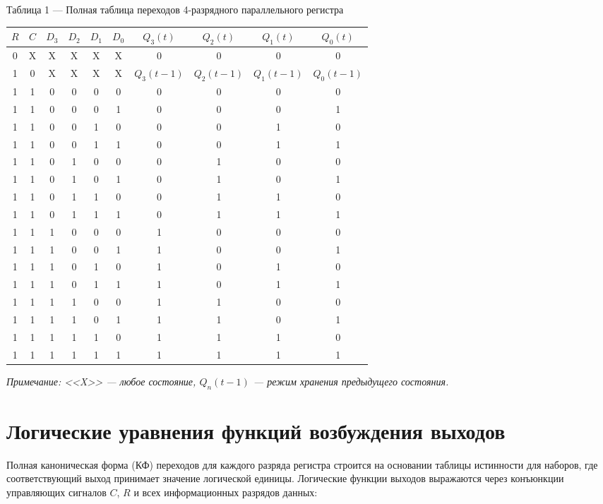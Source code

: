 \documentclass[oneside,a4paper,14pt]{extarticle}
\begin{document}
\begin{center}
  Таблица 1 --- Полная таблица переходов 4-разрядного параллельного регистра \\
  \vspace{3mm}
  \begin{tabular}{cccccc|cccc}
    $R$ & $C$ & $D_3$ & $D_2$ & $D_1$ & $D_0$ & $Q_3(t)$ & $Q_2(t)$ & $Q_1(t)$ & $Q_0(t)$ \\
    \hline
    0 & X & X & X & X & X & 0 & 0 & 0 & 0 \\
    1 & 0 & X & X & X & X & $Q_3(t-1)$ & $Q_2(t-1)$ & $Q_1(t-1)$ & $Q_0(t-1)$ \\
    \hline
    1 & 1 & 0 & 0 & 0 & 0 & 0 & 0 & 0 & 0 \\
    1 & 1 & 0 & 0 & 0 & 1 & 0 & 0 & 0 & 1 \\
    1 & 1 & 0 & 0 & 1 & 0 & 0 & 0 & 1 & 0 \\
    1 & 1 & 0 & 0 & 1 & 1 & 0 & 0 & 1 & 1 \\
    1 & 1 & 0 & 1 & 0 & 0 & 0 & 1 & 0 & 0 \\
    1 & 1 & 0 & 1 & 0 & 1 & 0 & 1 & 0 & 1 \\
    1 & 1 & 0 & 1 & 1 & 0 & 0 & 1 & 1 & 0 \\
    1 & 1 & 0 & 1 & 1 & 1 & 0 & 1 & 1 & 1 \\
    1 & 1 & 1 & 0 & 0 & 0 & 1 & 0 & 0 & 0 \\
    1 & 1 & 1 & 0 & 0 & 1 & 1 & 0 & 0 & 1 \\
    1 & 1 & 1 & 0 & 1 & 0 & 1 & 0 & 1 & 0 \\
    1 & 1 & 1 & 0 & 1 & 1 & 1 & 0 & 1 & 1 \\
    1 & 1 & 1 & 1 & 0 & 0 & 1 & 1 & 0 & 0 \\
    1 & 1 & 1 & 1 & 0 & 1 & 1 & 1 & 0 & 1 \\
    1 & 1 & 1 & 1 & 1 & 0 & 1 & 1 & 1 & 0 \\
    1 & 1 & 1 & 1 & 1 & 1 & 1 & 1 & 1 & 1 \\
  \end{tabular}
\end{center}
\textit{Примечание: <<X>> --- любое состояние, $Q_n(t-1)$ --- режим хранения предыдущего состояния.}

\newpage
\section{Логические уравнения функций возбуждения выходов}
Полная каноническая форма (КФ) переходов для каждого разряда регистра строится на основании таблицы истинности для наборов, где соответствующий выход принимает значение логической единицы. Логические функции выходов выражаются через конъюнкции управляющих сигналов $C$, $R$ и всех информационных разрядов данных:
\end{document}
